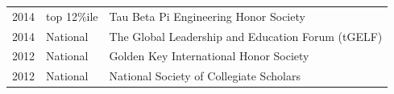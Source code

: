 \documentclass[a4paper]{deedy-resume} %
\begin{document}
\begin{minipage}[t]{0.66\textwidth}
\begin{tabular}{rll}
2014 & top 12\%ile & Tau Beta Pi Engineering Honor Society\\
2014 & National & The Global Leadership and Education Forum (tGELF)\\
2012 & National & Golden Key International Honor Society\\
2012 & National & National Society of Collegiate Scholars\\
\end{tabular}

\sectionspace %


\end{minipage} %








\end{document}
